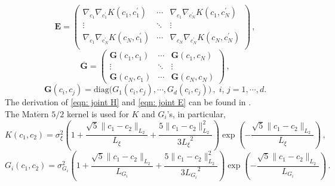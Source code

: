 \begin{equation}
    \boldsymbol{E} =
    \begin{pmatrix}
        \nabla_{c_1} \nabla_{c_1^\prime} K(c_1, c_1^\prime) & \cdots &
        \nabla_{c_1} \nabla_{c_N^\prime} K(c_1, c_N^\prime)\\
        \vdots & \ddots & \vdots \\
        \nabla_{c_1} \nabla_{c_N^\prime} K(c_N, c_1^\prime) & \cdots &
        \nabla_{c_N} \nabla_{c_N^\prime} K(c_N, c_N^\prime)\\
    \end{pmatrix}\,,
    \label{eqn: joint E}
\end{equation}
\begin{equation}
    \overline{\boldsymbol{G}} =
    \begin{pmatrix}
        \boldsymbol{G}(c_1, c_1) & \cdots & \boldsymbol{G}(c_1, c_N) \\
        \vdots & \ddots & \vdots \\
        \boldsymbol{G}(c_N, c_1) & \cdots & \boldsymbol{G}(c_N, c_N)
    \end{pmatrix}\,,
\end{equation}
\begin{equation}
    \boldsymbol{G}(c_i, c_j) = \textrm{diag}\big(G_1(c_i, c_j), \cdots, G_d(c_i, c_j)\big)\,,
    \; i, \, j=1,\cdots, d.
\end{equation}
The derivation of \eqref{eqn: joint H} and \eqref{eqn: joint E} can be found in \cite{grad coKriging}.\\

The Mat$\acute{\textrm{e}}$rn $5/2$ kernel is used for $K$ and $G_i$'s, in particular,
\begin{equation}
       K(c_1,c_2) = \sigma_\xi^2
       \left(1+ \frac{\sqrt{5}\|c_1-c_2\|_{L_2}}{L_\xi}
       + \frac{5\|c_1-c_2\|_{L_2}^2}{ 3{L_\xi}^2}\right)
       \exp\left(-\frac{\sqrt{5}\|c_1-c_2\|_{L_2}}{{L_\xi}}\right) \,,
\end{equation}
\begin{equation}
       G_i(c_1,c_2) = \sigma_{G_i}^2
       \left(1+ \frac{\sqrt{5}\|c_1-c_2\|_{L_2}}{L_{G_i}}
       + \frac{5\|c_1-c_2\|_{L_2}^2}{ 3{L_{G_i}}^2}\right)
       \exp\left(-\frac{\sqrt{5}\|c_1-c_2\|_{L_2}}{{L_{G_i}}}\right) \,.
\end{equation}


